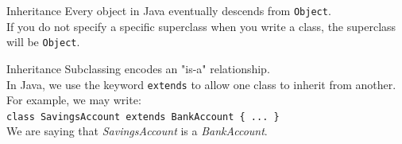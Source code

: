 \documentclass{beamer}
\begin{document}
\begin{frame}{Inheritance}
Every object in Java eventually descends from \texttt{Object}. \\
\vspace{1em}
If you do not specify a specific superclass when you write a class, the superclass will be \texttt{Object}. \\
\end{frame}



\begin{frame}[fragile]{Inheritance}
Subclassing encodes an "is-a" relationship. \\
\vspace{1em}
In Java, we use the keyword \texttt{extends} to allow one class to inherit from another. For example, we may write: \\ 
\vspace{1em}
\texttt{class SavingsAccount extends BankAccount \{ ... \}} \\
\vspace{1em}
We are saying that \textit{SavingsAccount} is a \textit{BankAccount}. \\
\end{frame}
\end{document}
